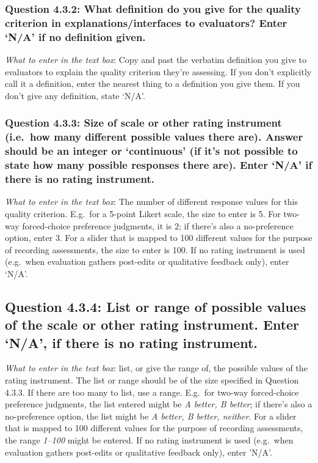 \documentclass[11pt,a4paper]{article}
\begin{document}
\subsubsection*{Question 4.3.2:  What definition do you give for the quality criterion in explanations/interfaces to evaluators? Enter `N/A' if no definition given.}

\noindent\textit{What to enter in the text box}: Copy and past the verbatim definition you give to evaluators to explain the quality criterion they're assessing. If you don't explicitly call it a definition, enter the nearest thing to a definition you give them.  If you don't give any definition, state `N/A'.

\subsubsection*{Question 4.3.3:  Size of scale or other rating instrument (i.e.\ how many different possible values there are). Answer should be an integer or `continuous' (if it's not possible to state how many possible responses there are). Enter `N/A' if there is no rating instrument.}

\noindent\textit{What to enter in the text box}: The number of different response values for this quality criterion. E.g.\ for a 5-point Likert scale, the size to enter is 5. For two-way forced-choice preference judgments, it is 2; if there's also a no-preference option, enter 3. For a slider that is mapped to 100 different values for the purpose of recording assessments, the size to enter is 100. If no rating instrument is used (e.g.\ when evaluation gathers post-edits or qualitative feedback only), enter `N/A'.

\subsection*{Question 4.3.4: List or range of possible values of the scale or other rating instrument. Enter `N/A', if there is no rating instrument.}

\noindent\textit{What to enter in the text box}: list, or give the range of, the possible values  of the rating instrument. The list or range should be of the size specified in Question 4.3.3. If there are too many to list, use a range. E.g.\ for two-way forced-choice preference judgments, the list entered might be \textit{A better, B better}; if there's also a no-preference option, the list 
might be \textit{A better, B better, neither}. For a slider that is mapped to 100 different values for the purpose of recording assessments, the range \textit{1--100} might be entered. If no rating instrument is used (e.g.\ when evaluation gathers post-edits or qualitative feedback only), enter 'N/A'.
\end{document}
